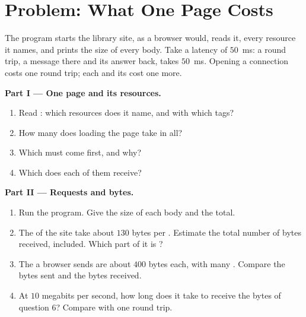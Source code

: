 \section{Problem: What One Page Costs}\label{sec:g10:http-clients-servers:problem}

\begin{problem}\label{pb:g10:http-clients-servers:1}
The program  starts the library site,   as a browser would,
reads it,  every resource it names, and prints the size of every body. Take a latency of $50$~ms: a round
trip, a message there and its answer back, takes $50$~ms. Opening a connection costs one round trip; each 
and its  cost one more.

\medskip\noindent\textbf{Part I --- One page and its resources.}
\begin{enumerate}
  \item Read : which resources does it name, and with which tags?
  \item How many  does loading the page take in all?
  \item Which  must come first, and why?
  \item Which  does each of them receive?
\end{enumerate}

\medskip\noindent\textbf{Part II --- Requests and bytes.}
\begin{enumerate}[resume]
  \item Run the program. Give the size of each body and the total.
  \item The   of the site take about $130$ bytes per . Estimate the total number of bytes
    received,  included. Which part of it is ?
  \item The  a browser sends are about $400$ bytes each, with many . Compare the bytes sent and the
    bytes received.
  \item At $10$ megabits per second, how long does it take to receive the bytes of question 6? Compare with one round
    trip.
\end{enumerate}


\end{problem}
